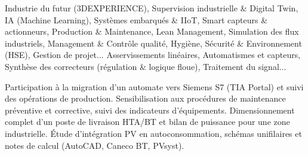 \documentclass[10pt,a4paper]{../altacv}
\begin{document}
\cvidentite
{}
\makecvheader

\cvformation
{Industrie du futur (3DEXPERIENCE), Supervision industrielle \& Digital Twin, IA (Machine Learning), Systèmes embarqués \& IIoT, Smart capteurs \& actionneurs, Production \& Maintenance, Lean Management, Simulation des flux industriels, Management \& Contrôle qualité, Hygiène, Sécurité \& Environnement (HSE), Gestion de projet...}
{Asservissements linéaires, Automatismes et capteurs, Synthèse des correcteurs (régulation \& logique floue), Traitement du signal...}

\expmenara
{Participation à la migration d’un automate vers Siemens S7 (TIA Portal) et suivi des opérations de production.}
{Sensibilisation aux procédures de maintenance préventive et corrective, suivi des indicateurs d’équipements.}
\vspace{2pt}
\expcore
{Dimensionnement complet d’un poste de livraison HTA/BT et bilan de puissance pour une zone industrielle.}
{Étude d’intégration PV en autoconsommation, schémas unifilaires et notes de calcul (AutoCAD, Caneco BT, PVsyst).}
\end{document}
